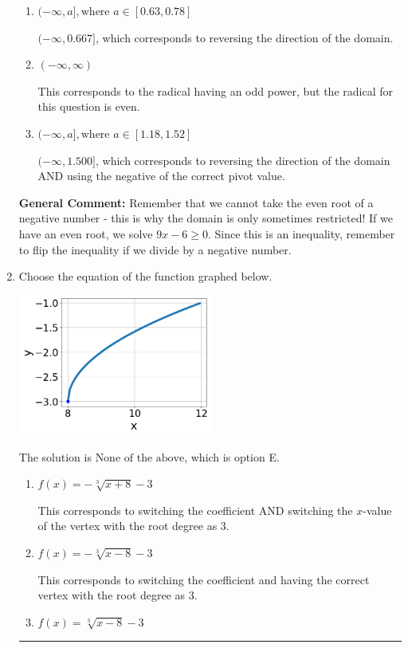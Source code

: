 \documentclass{extbook}[14pt]
\newcommand{\litem}[1]{\item #1

\rule{\textwidth}{0.4pt}}
\begin{document}
\begin{enumerate}
{\begin{enumerate}[label=\Alph*.]
$[1.500, \infty)$, which corresponds to using the negative of the correct pivot value.
\item \( (-\infty, a], \text{where } a \in [0.63, 0.78] \)

 $(-\infty, 0.667]$, which corresponds to reversing the direction of the domain.
\item \( (-\infty, \infty) \)

This corresponds to the radical having an odd power, but the radical for this question is even.
\item \( (-\infty, a], \text{where } a \in [1.18, 1.52] \)

$(-\infty, 1.500]$, which corresponds to reversing the direction of the domain AND using the negative of the correct pivot value.
\end{enumerate}

\textbf{General Comment:} Remember that we cannot take the even root of a negative number - this is why the domain is only sometimes restricted! If we have an even root, we solve $9 x - 6 \geq 0$. Since this is an inequality, remember to flip the inequality if we divide by a negative number.
}
\litem{
Choose the equation of the function graphed below.

\begin{center}
    \includegraphics[width=0.5\textwidth]{../Figures/radicalGraphToEquationB.png}
\end{center}


The solution is \( \text{None of the above} \), which is option E.\begin{enumerate}[label=\Alph*.]
\item \( f(x) = - \sqrt[3]{x + 8} - 3 \)

This corresponds to switching the coefficient AND switching the $x$-value of the vertex with the root degree as $3$.
\item \( f(x) = - \sqrt[3]{x - 8} - 3 \)

This corresponds to switching the coefficient and having the correct vertex with the root degree as $3$.
\item \( f(x) = \sqrt[3]{x - 8} - 3 \)


\end{enumerate}}
\end{enumerate}
\end{document}
